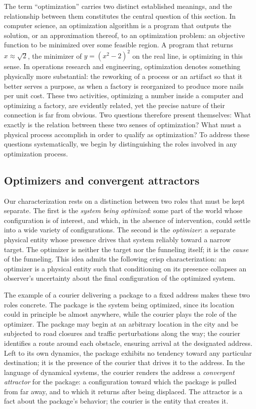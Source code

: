 \documentclass[11pt]{article}
\begin{document}
The term ``optimization'' carries two distinct established meanings, and the relationship between them constitutes the central question of this section. In computer science, an optimization algorithm is a program that outputs the solution, or an approximation thereof, to an optimization problem: an objective function to be minimized over some feasible region. A program that returns $x \approx \sqrt 2$, the minimizer of $y = (x^2 - 2)^2$ on the real line, is optimizing in this sense. In operations research and engineering, optimization denotes something physically more substantial: the reworking of a process or an artifact so that it better serves a purpose, as when a factory is reorganized to produce more nails per unit cost. These two activities, optimizing a number inside a computer and optimizing a factory, are evidently related, yet the precise nature of their connection is far from obvious. Two questions therefore present themselves: What exactly is the relation between these two senses of optimization? What must a physical process accomplish in order to qualify as optimization? To address these questions systematically, we begin by distinguishing the roles involved in any optimization process.

\subsection{Optimizers and convergent attractors}
\label{sec:attractor}

Our characterization rests on a distinction between two roles that must be kept separate. The first is the \emph{system being optimized}: some part of the world whose configuration is of interest, and which, in the absence of intervention, could settle into a wide variety of configurations. The second is the \emph{optimizer}: a separate physical entity whose presence drives that system reliably toward a narrow target. The optimizer is neither the target nor the funneling itself; it is the \emph{cause} of the funneling. This idea admits the following crisp characterization: an optimizer is a physical entity such that conditioning on its presence collapses an observer's uncertainty about the final configuration of the optimized system.

The example of a courier delivering a package to a fixed address makes these two roles concrete. The package is the system being optimized, since its location could in principle be almost anywhere, while the courier plays the role of the optimizer. The package may begin at an arbitrary location in the city and be subjected to road closures and traffic perturbations along the way; the courier identifies a route around each obstacle, ensuring arrival at the designated address. Left to its own dynamics, the package exhibits no tendency toward any particular destination; it is the presence of the courier that drives it to the address. In the language of dynamical systems, the courier renders the address a \emph{convergent attractor} for the package: a configuration toward which the package is pulled from far away, and to which it returns after being displaced. The attractor is a fact about the package's behavior; the courier is the entity that creates it.
\end{document}
